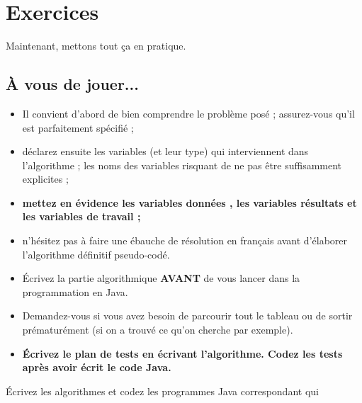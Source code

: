 \documentclass[11pt,a4paper]{article}
\begin{document}
            \par
        \section{Exercices}
				Maintenant, mettons tout \c ca en pratique.
      
            \par
        \subsection{\`A vous de jouer...}
					\begin{itemize}
				
			\item Il convient d'abord de bien comprendre le probl\`eme pos\'e ; assurez-vous qu'il est parfaitement sp\'ecifi\'e ;
			\item d\'eclarez ensuite les variables (et leur type) qui interviennent dans l'algorithme ; les noms des variables risquant de ne pas \^etre suffisamment explicites ;
			\item \textbf{mettez en \'evidence les variables \guillemotleft  donn\'ees \guillemotright , les variables \guillemotleft  r\'esultats \guillemotright  et les variables de travail ;}
			\item n'h\'esitez pas \`a faire une \'ebauche de r\'esolution en fran\c cais avant d'\'elaborer l'algorithme d\'efinitif pseudo-cod\'e.
			\item \'Ecrivez la partie algorithmique \textbf{AVANT} de vous lancer dans la programmation en Java.
			\item Demandez-vous si vous avez besoin de parcourir tout le tableau ou de sortir pr\'ematur\'ement (si on a trouv\'e ce qu'on cherche par exemple).
			\item \textbf{\'Ecrivez le plan de tests en \'ecrivant l'algorithme. Codez les tests apr\`es avoir \'ecrit le code Java.}
					\end{itemize}
				
            \par
        
        \'Ecrivez les algorithmes et codez les programmes Java correspondant qui 
          
\end{document}
